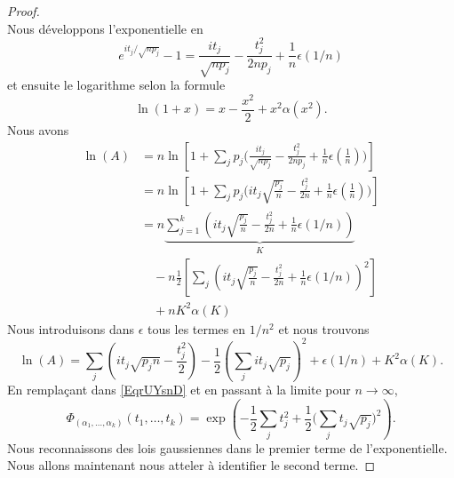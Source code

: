 \begin{proof}
\begin{equation}
    \end{equation}
    Nous développons l'exponentielle en
    \begin{equation}
        e^{it_j/\sqrt{np_j}}-1=\frac{ it_j }{ \sqrt{np_j} }-\frac{ t_j^2 }{ 2np_j }+\frac{1}{ n }\epsilon(1/n)
    \end{equation}
    et ensuite le logarithme selon la formule
    \begin{equation}
        \ln(1+x)=x-\frac{ x^2 }{2}+x^2\alpha(x^2).
    \end{equation}
    Nous avons
    \begin{subequations}
        \begin{align}
            \ln(A)&=n\ln\left[ 1+\sum_jp_j\Big( \frac{ it_j }{ \sqrt{np_j} }-\frac{ t_j^2 }{ 2np_j }+\frac{1}{ n }\epsilon(\frac{1}{ n }) \Big) \right]\\
            &=n\ln\left[ 1+\sum_jp_j\Big(it_j \sqrt{\frac{ p_j }{ n }}-\frac{ t_j^2 }{ 2n}+\frac{1}{ n }\epsilon(\frac{1}{ n }) \Big) \right]\\
            &=n\underbrace{\sum_{j=1}^k\left( it_j\sqrt{\frac{ p_j }{ n }}-\frac{ t_j^2 }{ 2n }+\frac{1}{ n }\epsilon(1/n) \right)}_{K}\\
            &\quad-n\frac{ 1 }{2}\left[ \sum_{j}\left( it_j\sqrt{\frac{ p_j }{ n }}-\frac{ t_j^2 }{ 2n }+\frac{1}{ n }\epsilon(1/n) \right)^2 \right]\\
            &\quad +nK^2\alpha(K)
        \end{align}
    \end{subequations}
    Nous introduisons dans \( \epsilon\) tous les termes en \( 1/n^2\) et nous trouvons
    \begin{equation}
        \ln(A)=\sum_j\left( it_j\sqrt{p_jn}-\frac{ t_j^2 }{2} \right)-\frac{ 1 }{2}\left( \sum_jit_j\sqrt{p_j} \right)^2+\epsilon(1/n)+K^2\alpha(K).
    \end{equation}
    En remplaçant dans \eqref{EqrUYsnD} et en passant à la limite pour \( n\to\infty\),
    \begin{equation}    \label{EaqTXgCW}
        \Phi_{(\alpha_1,\ldots, \alpha_k)}(t_1,\ldots, t_k)=\exp\left( -\frac{ 1 }{2}\sum_jt_j^2+\frac{ 1 }{2}\big( \sum_jt_j\sqrt{p_j} \big)^2 \right).
    \end{equation}
    Nous reconnaissons des lois gaussiennes dans le premier terme de l'exponentielle. Nous allons maintenant nous atteler à identifier le second terme.


\end{proof}
